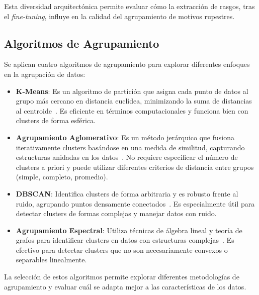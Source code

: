 Esta diversidad arquitectónica permite evaluar cómo la extracción de rasgos, tras el \emph{fine-tuning}, influye en la calidad del agrupamiento de motivos rupestres.

\subsection{Algoritmos de Agrupamiento}

Se aplican cuatro algoritmos de agrupamiento para explorar diferentes enfoques en la agrupación de datos:

\begin{itemize}
    \item \textbf{K-Means}:
    Es un algoritmo de partición que asigna cada punto de datos al grupo más cercano en distancia euclídea, minimizando la suma de distancias al centroide~\cite{macqueen1967some}.
    Es eficiente en términos computacionales y funciona bien con clusters de forma esférica.
    \item \textbf{Agrupamiento Aglomerativo}:
    Es un método jerárquico que fusiona iterativamente clusters basándose en una medida de similitud, capturando estructuras anidadas en los datos~\cite{rokach2005clustering}.
    No requiere especificar el número de clusters a priori y puede utilizar diferentes criterios de distancia entre grupos (simple, completo, promedio).
    \item \textbf{DBSCAN}:
    Identifica clusters de forma arbitraria y es robusto frente al ruido, agrupando puntos densamente conectados~\cite{ester1996density}.
    Es especialmente útil para detectar clusters de formas complejas y manejar datos con ruido.
    \item \textbf{Agrupamiento Espectral}:
    Utiliza técnicas de álgebra lineal y teoría de grafos para identificar clusters en datos con estructuras complejas~\cite{ng2002spectral}.
    Es efectivo para detectar clusters que no son necesariamente convexos o separables linealmente.
\end{itemize}

La selección de estos algoritmos permite explorar diferentes metodologías de agrupamiento y evaluar cuál se adapta mejor a las características de los datos.

